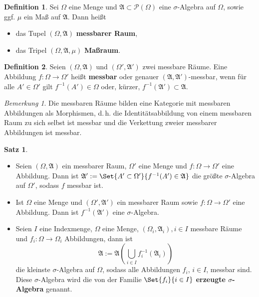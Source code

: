 \documentclass[a4paper,10pt,landscape]{article}
\newcommand{\PS}{\mathcal{P}} %
\newcommand{\PSO}{\PS(\Omega)} %
\newcommand{\Alg}{\mathfrak{A}}
\theoremstyle{definition}
\newtheorem*{defn}{Definition}
\newtheorem*{satz}{Satz}
\theoremstyle{remark}
\newtheorem*{bem}{Bemerkung}
\renewcommand{\emph}[1]{\textcolor{Emph}{\bf{#1}}}
\begin{document}
\begin{multicols}{3}
\begin{defn}
  Sei $\Omega$ eine Menge und $\Alg \subset \PSO$ eine $\sigma$-Algebra auf $\Omega$, sowie ggf. $\mu$ ein Maß auf $\Alg$. Dann heißt
  \begin{itemize}
    \item das Tupel $(\Omega, \Alg)$ \emph{messbarer Raum},
    \item das Tripel $(\Omega, \Alg, \mu)$ \emph{Maßraum}.
  \end{itemize}
\end{defn}

\begin{defn}
  Seien $(\Omega, \Alg)$ und $(\Omega', \Alg')$ zwei messbare Räume. Eine Abbildung $f : \Omega \to \Omega'$ heißt \emph{messbar} oder genauer $(\Alg, \Alg')$-messbar, wenn für alle $A' \in \Omega'$ gilt $f^{-1}(A') \in \Omega$ oder, kürzer, $f^{-1}(\Alg') \subset \Alg$.
\end{defn}

\begin{bem}
  Die messbaren Räume bilden eine Kategorie mit messbaren Abbildungen als Morphismen, d.\,h. die Identitätsabbildung von einem messbaren Raum zu sich selbst ist messbar und die Verkettung zweier messbarer Abbildungen ist messbar.
\end{bem}

\begin{satz}
  \begin{itemize}
    \item Seien $(\Omega, \Alg)$ ein messbarer Raum, $\Omega'$ eine Menge und $f : \Omega \to \Omega'$ eine Abbildung. Dann ist $\Alg' := \Set{ A' \subset \Omega' }{ f^{-1}(A') \in \Alg }$ die größte $\sigma$-Algebra auf $\Omega'$, sodass $f$ messbar ist.
    \item Ist $\Omega$ eine Menge und $(\Omega', \Alg')$ ein messbarer Raum sowie $f : \Omega \to \Omega'$ eine Abbildung. Dann ist $f^{-1}(\Alg')$ eine $\sigma$-Algebra.
    \item Seien $I$ eine Indexmenge, $\Omega$ eine Menge, $(\Omega_i, \Alg_i), i \in I$ messbare Räume und $f_i : \Omega \to \Omega_i$ Abbildungen, dann ist
    \[ \Alg := \Alg\left( \bigcup_{i \in I} f_i^{-1}(\Alg_i) \right) \]
    die kleinste $\sigma$-Algebra auf $\Omega$, sodass alle Abbildungen $f_i$, $i \in I$, messbar sind. Diese $\sigma$-Algebra wird die von der Familie $\Set{ f_i }{i \in I}$ \emph{erzeugte $\sigma$-Algebra} genannt.
  \end{itemize}
\end{satz}


\end{multicols}
\end{document}
